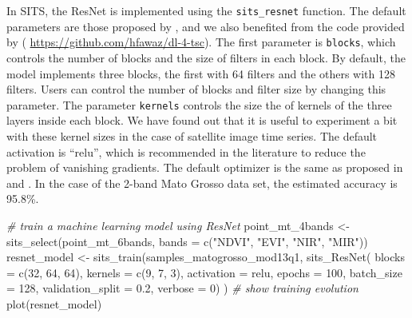 \documentclass[a4paper,]{tufte-book}
\newenvironment{Shaded}{}{}
\newcommand{\AttributeTok}[1]{\textcolor[rgb]{0.49,0.56,0.16}{#1}}
\newcommand{\CommentTok}[1]{\textcolor[rgb]{0.38,0.63,0.69}{\textit{#1}}}
\newcommand{\DecValTok}[1]{\textcolor[rgb]{0.25,0.63,0.44}{#1}}
\newcommand{\FloatTok}[1]{\textcolor[rgb]{0.25,0.63,0.44}{#1}}
\newcommand{\FunctionTok}[1]{\textcolor[rgb]{0.02,0.16,0.49}{#1}}
\newcommand{\NormalTok}[1]{#1}
\newcommand{\OtherTok}[1]{\textcolor[rgb]{0.00,0.44,0.13}{#1}}
\newcommand{\StringTok}[1]{\textcolor[rgb]{0.25,0.44,0.63}{#1}}
\begin{document}
In SITS, the ResNet is implemented using the \texttt{sits\_resnet} function. The default parameters are those proposed by \citet{Wang2017}, and we also benefited from the code provided by \citet{Fawaz2019} ( \url{https://github.com/hfawaz/dl-4-tsc}). The first parameter is \texttt{blocks}, which controls the number of blocks and the size of filters in each block. By default, the model implements three blocks, the first with 64 filters and the others with 128 filters. Users can control the number of blocks and filter size by changing this parameter. The parameter \texttt{kernels} controls the size the of kernels of the three layers inside each block. We have found out that it is useful to experiment a bit with these kernel sizes in the case of satellite image time series. The default activation is ``relu'', which is recommended in the literature to reduce the problem of vanishing gradients. The default optimizer is the same as proposed in \citet{Wang2017} and \citet{Fawaz2019}. In the case of the 2-band Mato Grosso data set, the estimated accuracy is 95.8\%.

\begin{Shaded}
\begin{Highlighting}[]
\CommentTok{\# train a machine learning model using ResNet}
\NormalTok{point\_mt\_4bands }\OtherTok{\textless{}{-}} \FunctionTok{sits\_select}\NormalTok{(point\_mt\_6bands, }
                               \AttributeTok{bands =} \FunctionTok{c}\NormalTok{(}\StringTok{"NDVI"}\NormalTok{, }\StringTok{"EVI"}\NormalTok{, }\StringTok{"NIR"}\NormalTok{, }\StringTok{"MIR"}\NormalTok{))}
\NormalTok{resnet\_model }\OtherTok{\textless{}{-}} \FunctionTok{sits\_train}\NormalTok{(samples\_matogrosso\_mod13q1, }
                       \FunctionTok{sits\_ResNet}\NormalTok{(}
                          \AttributeTok{blocks               =} \FunctionTok{c}\NormalTok{(}\DecValTok{32}\NormalTok{, }\DecValTok{64}\NormalTok{, }\DecValTok{64}\NormalTok{),}
                          \AttributeTok{kernels              =} \FunctionTok{c}\NormalTok{(}\DecValTok{9}\NormalTok{, }\DecValTok{7}\NormalTok{, }\DecValTok{3}\NormalTok{),}
                          \AttributeTok{activation           =} \StringTok{\textquotesingle{}relu\textquotesingle{}}\NormalTok{,}
                          \AttributeTok{epochs               =} \DecValTok{100}\NormalTok{,}
                          \AttributeTok{batch\_size           =} \DecValTok{128}\NormalTok{,}
                          \AttributeTok{validation\_split     =} \FloatTok{0.2}\NormalTok{,}
                          \AttributeTok{verbose              =} \DecValTok{0}\NormalTok{) )}
\CommentTok{\# show training evolution}
\FunctionTok{plot}\NormalTok{(resnet\_model)}
\end{Highlighting}
\end{Shaded}
\end{document}
